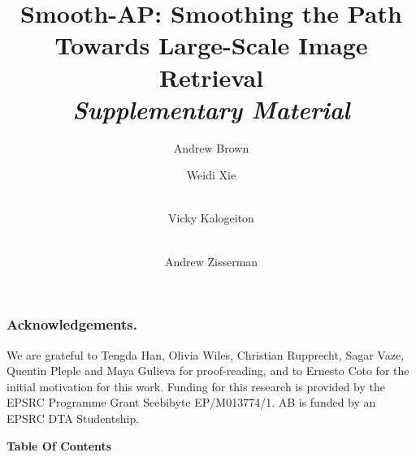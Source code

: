 \documentclass[runningheads]{llncs}
\newcommand{\beginsupplement}{\setcounter{table}{0}
        \renewcommand{\thetable}{S\arabic{table}}\setcounter{figure}{0}
        \renewcommand{\thefigure}{S\arabic{figure}}}
\begin{document}
\subsubsection{Acknowledgements.}
We are grateful to Tengda Han, Olivia Wiles, Christian Rupprecht, Sagar Vaze, Quentin Pleple and Maya Gulieva for proof-reading, and to Ernesto Coto for the initial motivation for this work. 
Funding for this research is provided by the EPSRC Programme Grant Seebibyte EP/M013774/1. AB is funded by an EPSRC DTA Studentship. 
 \label{sec:conclusion}



\clearpage







\title{Smooth-AP: Smoothing the Path \\ Towards Large-Scale Image Retrieval \\ \textit{Supplementary Material}} 


\author{Andrew Brown \and 
Weidi Xie \and \\
Vicky Kalogeiton\and \\
Andrew Zisserman}



\beginsupplement

\maketitle

\begin{center}
  \textbf{\large{Table Of Contents}}
\end{center}
\startcontents[sections]
\end{document}
